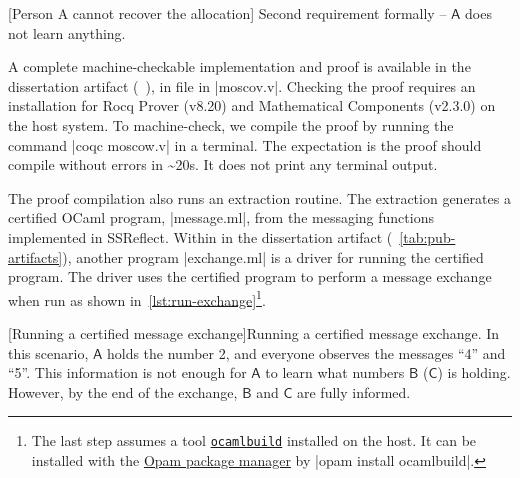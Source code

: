 \begin{center}
\begin{minipage}{\textwidth}
\captionsetup{type=lstlisting}
[Person A cannot recover the allocation]
{Second requirement formally -- \(\mathsf{A}\) does not learn anything.}
\label{lst:lemma-2}
\end{minipage}
\end{center}

A complete machine-checkable implementation and proof is available in the dissertation artifact (\cf~), in file in \pr|moscov.v|.
Checking the proof requires an installation for Rocq Prover (v8.20) and Mathematical Components (v2.3.0) on the host system.
To machine-check, we compile the proof by running the command \pr|coqc moscow.v| in a terminal.
The expectation is the proof should compile without errors in \textasciitilde{}20s.
It does not print any terminal output.

The proof compilation also runs an extraction routine.
The extraction generates a certified OCaml program, \pr|message.ml|, from the messaging functions implemented in SSReflect.
Within in the dissertation artifact (\cf~\autoref{tab:pub-artifacts}), another program \pr|exchange.ml| is a {driver} for running the certified program.
The driver uses the certified program to perform a message exchange when run as shown in~\autoref{lst:run-exchange}\footnote{%
The last step assumes a tool \href{https://github.com/ocaml/ocamlbuild}{\texttt{ocamlbuild}} installed on the host.
It can be installed with the \href{https://opam.ocaml.org}{Opam package manager} by \pr|opam install ocamlbuild|.}.

\begin{center}
\captionsetup{type=lstlisting}
\begin{minipage}{\textwidth}
\end{minipage}
[Running a certified message exchange]{Running a certified message exchange.
In this scenario, \(\mathsf{A}\) holds the number 2, and everyone observes the messages \enquote{4} and \enquote{5}.
This information is not enough for \(\mathsf{A}\) to learn what numbers \(\mathsf{B}\) (\resp \(\mathsf{C}\)) is holding.
However, by the end of the exchange, \(\mathsf{B}\) and \(\mathsf{C}\) are fully informed.}
\label{lst:run-exchange}
\end{center}

